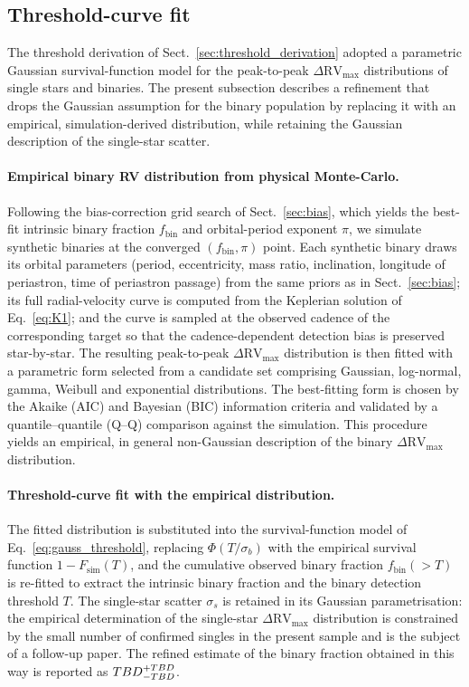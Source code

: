 \subsection{Threshold-curve fit}
\label{sec:threshold_fit}

The threshold derivation of Sect.~\ref{sec:threshold_derivation} adopted
a parametric Gaussian survival-function model for the peak-to-peak
$\Delta\mathrm{RV}_{\max}$ distributions of single stars and binaries.
The present subsection describes a refinement that drops the Gaussian
assumption for the binary population by replacing it with an empirical,
simulation-derived distribution, while retaining the Gaussian
description of the single-star scatter.

\paragraph{Empirical binary RV distribution from physical Monte-Carlo.}
Following the bias-correction grid search of Sect.~\ref{sec:bias}, which
yields the best-fit intrinsic binary fraction $f_\mathrm{bin}$ and
orbital-period exponent $\pi$, we simulate \Nsim synthetic binaries at
the converged $(f_\mathrm{bin}, \pi)$ point. Each synthetic binary
draws its orbital parameters (period, eccentricity, mass ratio,
inclination, longitude of periastron, time of periastron passage) from
the same priors as in Sect.~\ref{sec:bias}; its full radial-velocity
curve is computed from the Keplerian solution of Eq.~\ref{eq:K1}; and
the curve is sampled at the observed cadence of the corresponding
target so that the cadence-dependent detection bias is preserved
star-by-star. The resulting peak-to-peak $\Delta\mathrm{RV}_{\max}$
distribution is then fitted with a parametric form selected from a
candidate set comprising Gaussian, log-normal, gamma, Weibull and
exponential distributions. The best-fitting form is chosen by the
Akaike (AIC) and Bayesian (BIC) information criteria and validated by
a quantile--quantile (Q--Q) comparison against the simulation. This
procedure yields an empirical, in general non-Gaussian description of
the binary $\Delta\mathrm{RV}_{\max}$ distribution.

\paragraph{Threshold-curve fit with the empirical distribution.}
The fitted distribution is substituted into the survival-function model
of Eq.~\ref{eq:gauss_threshold}, replacing $\Phi(T/\sigma_b)$ with the
empirical survival function $1 - F_\mathrm{sim}(T)$, and the cumulative
observed binary fraction $f_\mathrm{bin}(>T)$ is re-fitted to extract
the intrinsic binary fraction and the binary detection threshold $T$.
The single-star scatter $\sigma_s$ is retained in its Gaussian
parametrisation: the empirical determination of the single-star
$\Delta\mathrm{RV}_{\max}$ distribution is constrained by the small
number of confirmed singles in the present sample and is the subject
of a follow-up paper. The refined estimate of the binary fraction
obtained in this way is reported as
${TBD}^{+TBD}_{-TBD}$.

